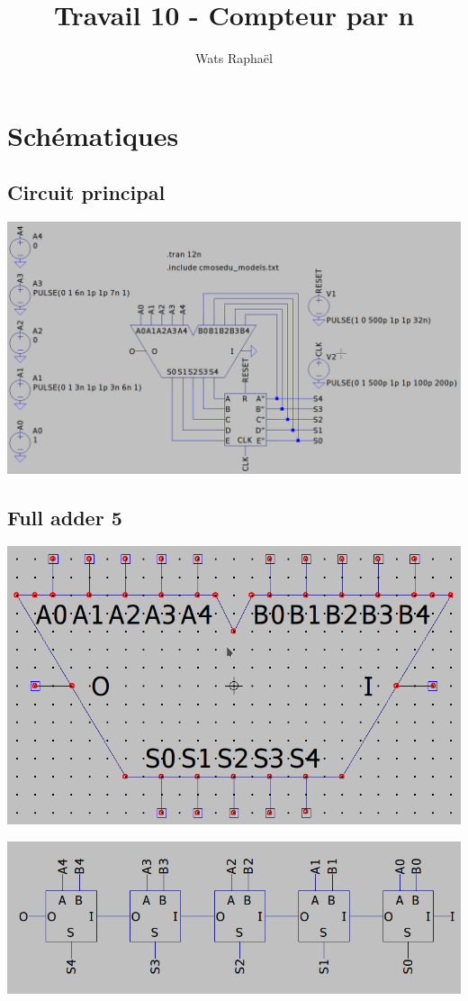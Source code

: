 \documentclass{homeworg}
\title{Travail 10 - Compteur par n}
\author{Wats Raphaël}
\begin{document}
\maketitle

\section{Schématiques}

\subsection{Circuit principal}
\begin{center}
    \includegraphics[scale=0.45]{main.png}
\end{center}

\newpage
\subsection{Full adder 5}
\begin{center}
    \includegraphics[scale=0.7]{fulladder5_asy.png}
    
    \includegraphics[scale=0.7]{fulladder5_asc.png}
\end{center}
\end{document}
